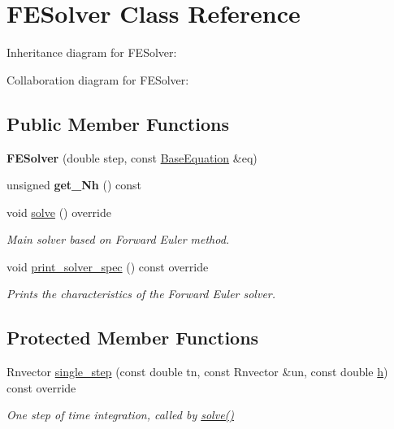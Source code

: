 \hypertarget{classFESolver}{}\section{F\+E\+Solver Class Reference}
\label{classFESolver}


Inheritance diagram for F\+E\+Solver\+:


Collaboration diagram for F\+E\+Solver\+:
\subsection*{Public Member Functions}
\begin{DoxyCompactItemize}
\item 
\mbox{\label{classFESolver_adbd4e19eb5c39bdbced70671961bbc4d}} 
{\bfseries F\+E\+Solver} (double step, const \hyperlink{classBaseEquation}{Base\+Equation} \&eq)
\item 
\mbox{\label{classFESolver_a1b7bde8ef3e3e4650096e1d56ad3add1}} 
unsigned {\bfseries get\+\_\+\+Nh} () const
\item 
\mbox{\label{classFESolver_ac6ac17db7001191c7bb32c3e8ce74d55}} 
void \hyperlink{classFESolver_ac6ac17db7001191c7bb32c3e8ce74d55}{solve} () override
\begin{DoxyCompactList}\small\item\em Main solver based on Forward Euler method. \end{DoxyCompactList}\item 
\mbox{\label{classFESolver_a46f8b70e97141583f68c5dfeb79e80c8}} 
void \hyperlink{classFESolver_a46f8b70e97141583f68c5dfeb79e80c8}{print\+\_\+solver\+\_\+spec} () const override
\begin{DoxyCompactList}\small\item\em Prints the characteristics of the Forward Euler solver. \end{DoxyCompactList}\end{DoxyCompactItemize}
\subsection*{Protected Member Functions}
\begin{DoxyCompactItemize}
\item 
Rnvector \hyperlink{classFESolver_acb3624bbe9132b8ab2989fc97ac33d81}{single\+\_\+step} (const double tn, const Rnvector \&un, const double \hyperlink{classBaseSolver_a6dbedd1610b0979379e6acbb0a4093cd}{h}) const override
\begin{DoxyCompactList}\small\item\em One step of time integration, called by \hyperlink{classFESolver_ac6ac17db7001191c7bb32c3e8ce74d55}{solve()} \end{DoxyCompactList}\end{DoxyCompactItemize}
